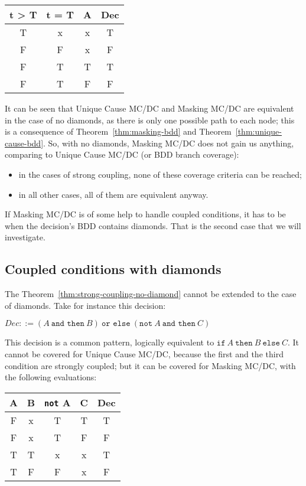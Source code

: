\documentclass[a4paper,12pt,twoside]{article}
\newcommand{\andthen}{\texttt{and then}}
\newcommand{\orelse}{\texttt{or else}}
\newcommand{\adanot}{\texttt{not}}
\newcommand{\adaif}{\texttt{if}}
\newcommand{\adathen}{\texttt{then}}
\newcommand{\adaelse}{\texttt{else}}
\begin{document}
\begin{center}
\begin{tabular}{|c|c|c||c|}
\hline
t > T & t = T & A & Dec \\ \hline
T     & x     & x & T \\ \hline
F     & F     & x & F \\ \hline
F     & T     & T & T \\ \hline
F     & T     & F & F \\ \hline
\end{tabular}
\end{center}

It can be seen that Unique Cause MC/DC and Masking
MC/DC are equivalent in the case of no diamonds, as there is only one
possible path to each node; this is a consequence of
Theorem~\ref{thm:masking-bdd} and Theorem~\ref{thm:unique-cause-bdd}.
So, with no diamonds, Masking MC/DC does not gain us anything, comparing
to Unique Cause MC/DC (or BDD branch coverage):
\begin{itemize}
\item in the cases of strong coupling, none of these coverage criteria
can be reached;
\item in all other cases, all of them are equivalent anyway.
\end{itemize}

If Masking MC/DC is of some help to handle coupled conditions, it has to
be when the decision's BDD contains diamonds. That is the second case that
we will investigate.

\subsection{Coupled conditions with diamonds}

The Theorem~\ref{thm:strong-coupling-no-diamond} cannot be extended to the
case of diamonds. Take for instance this decision:

$Dec ::= (A \ \andthen{} \ B) \ \orelse{} \ (\adanot{} \ A \ \andthen{} \ C)$

This decision is a common pattern, logically equivalent to
$\adaif{} \ A \ \adathen{} \ B \ \adaelse \ C$. It cannot be covered for
Unique Cause MC/DC, because the first and the third condition are strongly
coupled; but it can be covered for Masking MC/DC, with the following
evaluations:

\begin{center}
\begin{tabular}{|c|c|c|c||c|}
\hline
A & B & \adanot{} A & C & Dec\\ \hline
F & x & T           & T & T \\ \hline
F & x & T           & F & F \\ \hline
T & T & x           & x & T \\ \hline
T & F & F           & x & F \\ \hline
\end{tabular}
\end{center}
\end{document}
